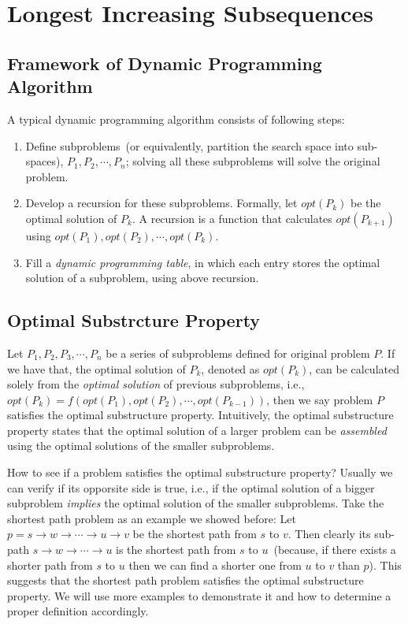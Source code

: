 \setcounter{definition}{0} \setcounter{property}{0} \setcounter{claim}{0} \setcounter{fact}{0} \setcounter{corollary}{0} \setcounter{figure}{0}
\section{Longest Increasing Subsequences}

\subsection*{Framework of Dynamic Programming Algorithm}

A typical dynamic programming algorithm consists of following steps:
\vspace*{-\topsep}
\begin{enumerate}
\item Define subproblems~(or equivalently, partition the search space into sub-spaces),
$P_1, P_2, \cdots, P_n$; solving all these subproblems will solve the original problem.
\item Develop a recursion for these subproblems. Formally, let $opt(P_k)$ be the optimal
solution of $P_k$. A recursion is a function that calculates
$opt(P_{k+1})$ using $opt(P_1), opt(P_2), \cdots, opt(P_k)$.
\item Fill a \emph{dynamic programming table},
in which each entry stores the optimal solution of a subproblem, 
using above recursion.
\end{enumerate}

\subsection*{Optimal Substrcture Property}

Let $P_1, P_2, P_3, \cdots, P_n$ be a series of subproblems defined for original problem $P$.
If we have that, the optimal solution of $P_k$, denoted as $opt(P_k)$,
can be calculated solely from the \emph{optimal solution} of previous subproblems,
i.e., $opt(P_k) = f(opt(P_1), opt(P_2), \cdots, opt(P_{k-1}))$,
then we say problem $P$ satisfies the optimal substructure property.
Intuitively, the optimal substructure property states that
the optimal solution of a larger problem can be \emph{assembled}
using the optimal solutions of the smaller subproblems.

How to see if a problem satisfies the optimal substructure property?
Usually we can verify if its opporsite side is true, i.e., if the optimal solution
of a bigger subproblem \emph{implies} the optimal solution of
the smaller subproblems.
Take the shortest path problem as an example we showed before:
Let $p = s \to w \to \cdots \to u \to v$
be the shortest path from $s$ to $v$.
Then clearly its sub-path $s\to w \to \cdots \to u$ is the shortest path from
$s$ to $u$~(because, if there exists a shorter path from $s$ to $u$
then we can find a shorter one from $u$ to $v$ than $p$).
This suggests that the shortest path problem
satisfies the optimal substructure property.
We will use more examples to demonstrate it
and how to determine a proper definition accordingly.


